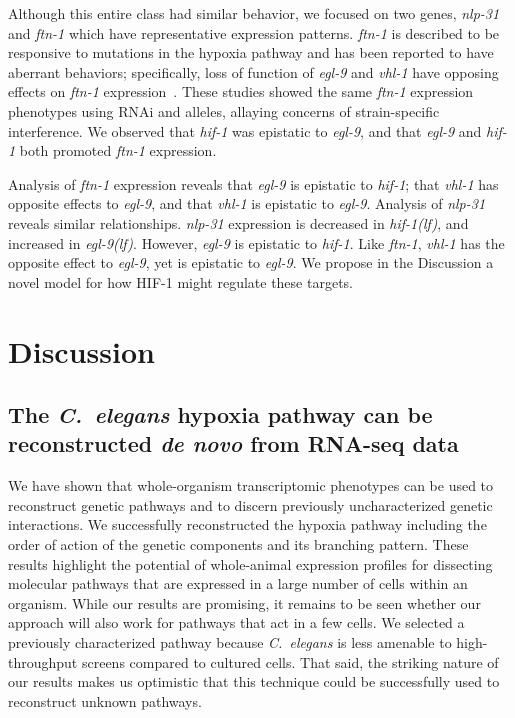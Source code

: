 \documentclass[9pt,twocolumn,twoside]{pnas-new}
\newcommand{\cel}{\emph{C.~elegans}}
\newcommand{\gene}[1]{\mbox{\emph{#1}}}
\newcommand{\nlp}{\gene{nlp-31}}
\newcommand{\ftna}{\gene{ftn-1}}
\newcommand{\egl}{\gene{egl-9(lf)}}
\newcommand{\hif}{\gene{hif-1(lf)}}
\newcommand{\hifp}{HIF-1}
\begin{document}
Although this entire class had similar behavior, we focused on two genes, \nlp{}
and \ftna{} which have representative expression patterns. \ftna{} is described
to be responsive to mutations in the hypoxia pathway and has been reported to
have aberrant behaviors; specifically, loss of function of \gene{egl-9} and
\gene{vhl-1} have opposing effects on \ftna{}
expression~\cite{Ackerman2012,Romney2011}. These studies showed the same \ftna{}
expression phenotypes using RNAi and alleles, allaying concerns of
strain-specific interference. We observed that \gene{hif-1} was epistatic to
\gene{egl-9}, and that \gene{egl-9} and \gene{hif-1} both promoted \ftna{}
expression.

Analysis of \ftna{} expression reveals that \gene{egl-9} is epistatic to
\gene{hif-1}; that \gene{vhl-1} has opposite effects to \gene{egl-9}, and that
\gene{vhl-1} is epistatic to \gene{egl-9}. Analysis of \nlp{} reveals similar
relationships. \nlp{} expression is decreased in \hif{}, and increased in
\egl{}. However, \gene{egl-9} is epistatic to \gene{hif-1}. Like \ftna{},
\gene{vhl-1} has the opposite effect to \gene{egl-9}, yet is epistatic to
\gene{egl-9}. We propose in the Discussion a novel model for how \hifp{} might
regulate these targets.


\section*{Discussion}
\label{sec:discussion}
\subsection*{The \cel{} hypoxia pathway can be reconstructed \emph{de novo} from
             RNA-seq data}
We have shown that whole-organism transcriptomic phenotypes can
be used to reconstruct genetic pathways and to discern previously
uncharacterized genetic interactions. We successfully reconstructed the hypoxia
pathway including the order of action of the genetic components and its
branching pattern.
\color{purple}
These results highlight the potential of whole-animal
expression profiles for dissecting molecular pathways that are expressed in a
large number of cells within an organism. While our results are promising, it
remains to be seen whether our approach will also work for pathways that act in
a few cells. We selected a previously characterized pathway because \cel{} is
less amenable to high-throughput screens compared to cultured cells. That said,
the striking nature of our results makes us optimistic that this technique could
be successfully used to reconstruct unknown pathways.
\color{black}
\end{document}
